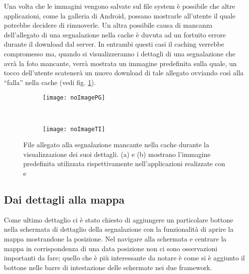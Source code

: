             Una volta che le immagini vengono salvate sul file system è
            possibile che altre applicazioni, come la galleria di Android,
            possano mostrarle all'utente il quale potrebbe decidere di
            rimuoverle. Un altra possibile causa di mancanza dell'allegato di
            una segnalazione nella cache è duvuta ad un fortuito errore durante
            il download dal server. In entrambi questi casi il caching verrebbe
            compromesso ma, quando si visualizzeranno i dettagli di una
            segnalazione che avrà la foto mancante, verrà mostrata un immagine
            predefinita sulla quale, un tocco dell'utente scatenerà un nuovo
            download di tale allegato ovviando così alla ``falla'' nella cache
            (vedi fig. \ref{fig:noImages}).
            \begin{figure}[h]
                \centering
                \begin{subfigure}[b]{0.485\textwidth}
                    \texttt{[image: noImagePG]}
                    \caption{}
                \end{subfigure}
                ~
                \begin{subfigure}[b]{0.485\textwidth}
                    \texttt{[image: noImageTI]}
                    \caption{}
                \end{subfigure}
                \caption{
                    File allegato alla segnalazione mancante nella cache durante
                    la visualizzazione dei suoi dettagli. (a) e (b) mostrano
                    l'immagine predefinita utilizzata rispettivamente
                    nell'applicazioni realizzate con \pg{} e \tisdk{}
                }
                \label{fig:noImages}
            \end{figure}


        \subsection{Dai dettagli alla mappa}
            Come ultimo dettaglio ci è stato chiesto di aggiungere un
            particolare bottone nella schermata di dettaglio della segnalazione
            con la funzionalità di aprire la mappa mostrandone la
            posizione. Nel navigare alla schermata e centrare la mappa in
            corrispondenza di una data posizione non ci sono osservazioni
            importanti da fare; quello che è più interessante da notare è come
            si è aggiunto il bottone nelle barre di intestazione delle schermate
            nei due framework.

